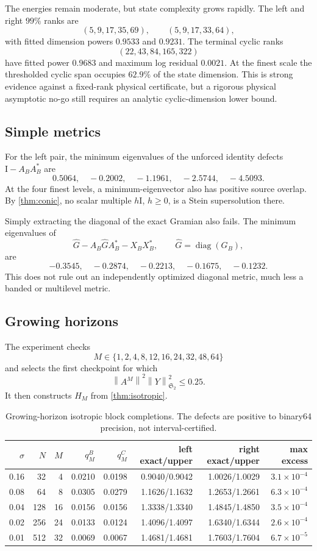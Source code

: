 \documentclass[11pt]{article}
\theoremstyle{definition}
\theoremstyle{remark}
\newcommand{\Id}{\mathrm I}
\newcommand{\HS}{\mathfrak S_2}
\newcommand{\norm}[1]{\left\lVert #1\right\rVert}
\begin{document}
The energies remain moderate, but state complexity grows rapidly.  The
left and right \(99\%\) ranks are
\[
 (5,9,17,35,69),
 \qquad
 (5,9,17,33,64),
\]
with fitted dimension powers \(0.9533\) and \(0.9231\).  The terminal
cyclic ranks
\[
 (22,43,84,165,322)
\]
have fitted power \(0.9683\) and maximum log residual \(0.0021\).  At the
finest scale the thresholded cyclic span occupies \(62.9\%\) of the state
dimension.  This is strong evidence against a fixed-rank physical
certificate, but a rigorous physical asymptotic no-go still requires an
analytic cyclic-dimension lower bound.

\subsection{Simple metrics}

For the left pair, the minimum eigenvalues of the unforced identity defects
\(\Id-A_BA_B^*\) are
\[
 0.5064,\quad -0.2002,\quad -1.1961,\quad -2.5744,\quad -4.5093.
\]
At the four finest levels, a minimum-eigenvector also has positive source
overlap.  By \cref{thm:conic}, no scalar multiple \(h\Id\), \(h\ge0\), is
a Stein supersolution there.

Simply extracting the diagonal of the exact Gramian also fails.  The
minimum eigenvalues of
\[
 \widehat G-A_B\widehat G A_B^*-X_BX_B^*,
 \qquad
 \widehat G=\operatorname{diag}(G_B),
\]
are
\[
 -0.3545,\quad -0.2874,\quad -0.2213,\quad -0.1675,\quad -0.1232.
\]
This does not rule out an independently optimized diagonal metric, much
less a banded or multilevel metric.

\subsection{Growing horizons}

The experiment checks
\[
 M\in\{1,2,4,8,12,16,24,32,48,64\}
\]
and selects the first checkpoint for which
\[
 \norm{A^M}^2\norm Y_{\HS}^2\le0.25.
\]
It then constructs \(H_M\) from \cref{thm:isotropic}.

\begin{table}[H]
\centering
\small
\begin{tabular}{@{}rrrrrrrr@{}}
\toprule
\(\sigma\)&\(N\)&\(M\)&\(q_M^B\)&\(q_M^C\)&left exact/upper&right exact/upper&max excess\\
\midrule
0.16&32 &4 &0.0210&0.0198&0.9040/0.9042&1.0026/1.0029&\(3.1\times10^{-4}\)\\
0.08&64 &8 &0.0305&0.0279&1.1626/1.1632&1.2653/1.2661&\(6.3\times10^{-4}\)\\
0.04&128&16&0.0156&0.0156&1.3338/1.3340&1.4845/1.4850&\(3.5\times10^{-4}\)\\
0.02&256&24&0.0133&0.0124&1.4096/1.4097&1.6340/1.6344&\(2.6\times10^{-4}\)\\
0.01&512&32&0.0069&0.0067&1.4681/1.4681&1.7603/1.7604&\(6.7\times10^{-5}\)\\
\bottomrule
\end{tabular}
\caption{Growing-horizon isotropic block completions.  The defects are
positive to binary64 precision, not interval-certified.}
\label{tab:block}
\end{table}
\end{document}
